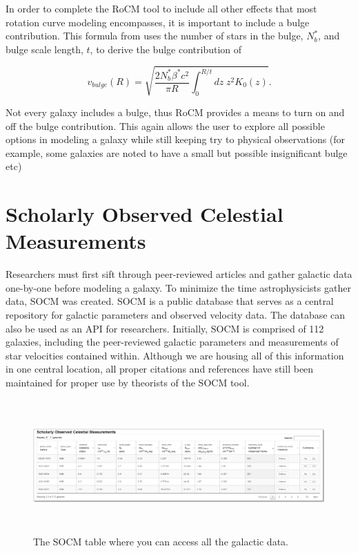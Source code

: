 \documentclass[conference]{IEEEtran-modified}
\begin{document}
In order to complete the RoCM tool to include all other effects that most rotation curve modeling encompasses, it is important to include a bulge contribution.  This formula from \cite{mannheim} uses the number of stars in the bulge, $N^*_b$, and bulge scale length, $t$, to derive the bulge contribution of

\begin{equation}
v_{bulge}(R) = \sqrt{\frac{2 N^*_b\beta^* c^2}{\pi R} \int_0^{R/t} dz\; z^2K_0(z)}.
\end{equation}

Not every galaxy includes a bulge, thus RoCM provides a means to turn on and off the bulge contribution.  This again allows the user to explore all possible options in modeling a galaxy while still keeping try to physical observations (for example, some galaxies are noted to have a small but possible insignificant bulge etc)

\section{Scholarly Observed Celestial Measurements}
Researchers must first sift through peer-reviewed articles and gather galactic data one-by-one before modeling a galaxy. To minimize the time astrophysicists gather data, SOCM was created. SOCM is a public database that serves as a central repository for galactic parameters and observed velocity data. The database can also be used as an API for researchers. Initially, SOCM is comprised of 112 galaxies, including the peer-reviewed galactic parameters and measurements of star velocities contained within.  Although we are housing all of this information in one central location, all proper citations and references have still been maintained for proper use by theorists of the SOCM tool.
       

\begin{figure}[!h]
\centering
\includegraphics[width=\textwidth, height=2in, keepaspectratio]{socmtable}
\caption{The SOCM table where you can access all the galactic data.}
\label{socm_fig}
\end{figure}
\end{document}
